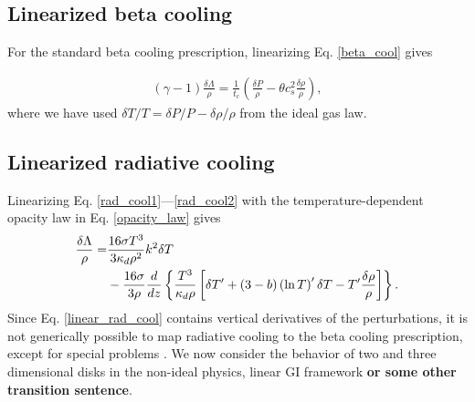 \subsection{Linearized beta cooling}
For the standard beta cooling prescription, linearizing
Eq. \ref{beta_cool} gives

\begin{align}
  (\gamma-1)\frac{\delta \Lambda}{\rho} = \frac{1}{t_c}\left(\frac{\delta P}{\rho} -
  \theta c_s^2 \frac{\delta\rho}{\rho}\right), \label{linear_beta}
\end{align}
where we have used $\delta T/T  = \delta P/P - \delta\rho/\rho$ from
the ideal gas law. 

\subsection{Linearized radiative cooling}
Linearizing Eq. \ref{rad_cool1}---\ref{rad_cool2} with the
temperature-dependent opacity law in Eq. \ref{opacity_law} gives
\begin{align}
  \frac{\delta \Lambda}{\rho} 
  =& \frac{16\sigma T^3}{3\kappa_d\rho^2} k^2 \delta T \notag\\
  & - \frac{16\sigma }{3\rho}\frac{d}{dz}\left\{
  \frac{T^3}{\kappa_d\rho}\left[\delta T^\prime +
    (3-b)\left(\ln{T}\right)^\prime \delta T - T^\prime \frac{\delta\rho}{\rho}\right]
  \right\}.\label{linear_rad_cool}
\end{align}
Since Eq. \ref{linear_rad_cool} contains vertical derivatives of the
perturbations, it is not generically possible to map radiative cooling 
to the beta cooling prescription, except for special problems
\citep[e.g.][]{lin15}. %
We now consider the behavior of two and three dimensional disks in the
non-ideal physics, linear GI framework {\bf or some other transition sentence}.

